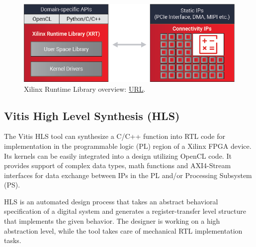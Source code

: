 \begin{figure}[H]
    \centering
        \includegraphics[width=1\textwidth]{Images/Platform/xrt.png}
        \decoRule
        \caption[Xilinx Runtime Library]{Xilinx Runtime Library overview: \href{https://www.xilinx.com/products/design-tools/vitis/xrt.html}{URL}.}
        \label{fig:XRT_overview}
\end{figure}

\subsection{Vitis High Level Synthesis (HLS)}
The Vitis HLS tool can synthesize a C/C++ function into RTL code for implementation in the programmable logic (PL) region of a Xilinx FPGA device. Its kernels can be easily integrated into a design utilizing OpenCL\cite{OpenCL} code. It provides support of complex data types, math functions and AXI4-Stream interfaces for data exchange between IPs in the PL and/or Processing Subsystem (PS).

HLS is an automated design process that takes an abstract behavioral specification of a digital system and generates a register-transfer level structure that implements the given behavior. The designer is working on a high abstraction level, while the tool takes care of mechanical RTL implementation tasks.

